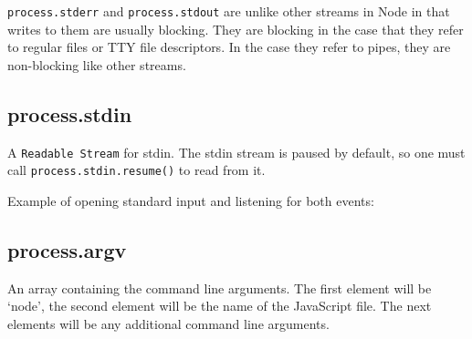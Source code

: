 \texttt{process.stderr} and \texttt{process.stdout} are unlike other
streams in Node in that writes to them are usually blocking. They are
blocking in the case that they refer to regular files or TTY file
descriptors. In the case they refer to pipes, they are non-blocking like
other streams.

\subsection{process.stdin}\label{process.stdin}

A \texttt{Readable Stream} for stdin. The stdin stream is paused by
default, so one must call \texttt{process.stdin.resume()} to read from
it.

Example of opening standard input and listening for both events:

\begin{Shaded}
\begin{Highlighting}[]
\NormalTok{();}
\NormalTok{(}\NormalTok{);}

\NormalTok{(}\NormalTok{, }
  \NormalTok{(} 
\NormalTok{\});}

\NormalTok{(}\NormalTok{, }\NormalTok{() \{}
  \NormalTok{(}\NormalTok{);}
\NormalTok{\});}
\end{Highlighting}
\end{Shaded}

\subsection{process.argv}\label{process.argv}

An array containing the command line arguments. The first element will
be `node', the second element will be the name of the JavaScript file.
The next elements will be any additional command line arguments.

\begin{Shaded}
\begin{Highlighting}[]
\NormalTok{(}
   
\NormalTok{\});}
\end{Highlighting}
\end{Shaded}

